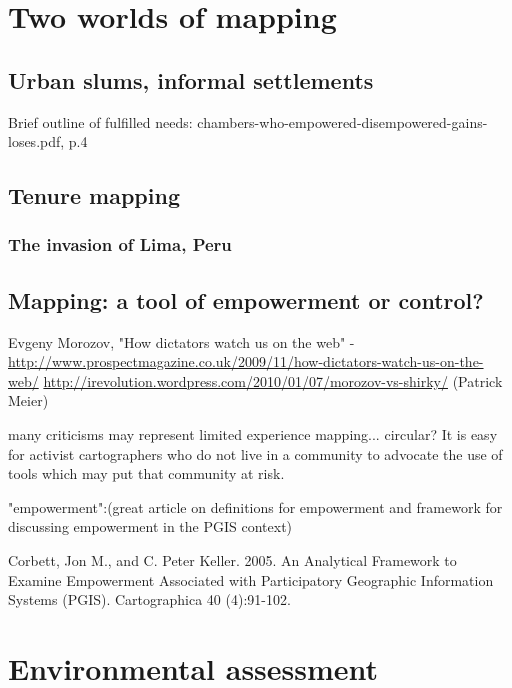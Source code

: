 \documentclass[11pt]{report}
\begin{document}
\section{Two worlds of mapping}
\subsection{Urban slums, informal settlements}

Brief outline of fulfilled needs: chambers-who-empowered-disempowered-gains-loses.pdf, p.4

\subsection{Tenure mapping}
\subsubsection{The invasion of Lima, Peru}

\subsection{Mapping: a tool of empowerment or control?}

Evgeny Morozov, "How dictators watch us on the web" - \url{http://www.prospectmagazine.co.uk/2009/11/how-dictators-watch-us-on-the-web/}
\url{http://irevolution.wordpress.com/2010/01/07/morozov-vs-shirky/} (Patrick Meier)

many criticisms may represent limited experience mapping... circular?
It is easy for activist cartographers who do not live in a community to advocate the use of tools which may put that community at risk.

"empowerment":(great article on definitions for empowerment and framework for discussing empowerment in the PGIS context)

Corbett, Jon M., and C. Peter Keller. 2005. An Analytical Framework to Examine Empowerment Associated with Participatory Geographic Information Systems (PGIS). Cartographica 40 (4):91-102.

\section{Environmental assessment}
\end{document}
